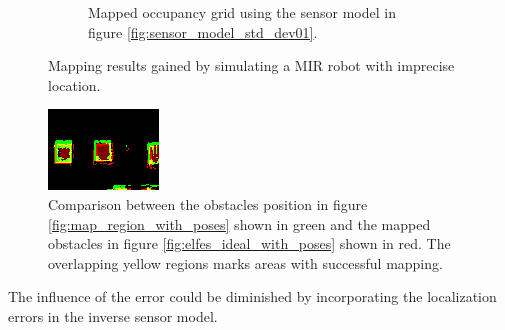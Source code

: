 \begin{figure}[htbp]
\begin{subfigure}[t]{0.45\textwidth}
		\caption{Mapped occupancy grid using the sensor model in figure \vref{fig:sensor_model_std_dev01}.}
		\label{fig:elfes_ideal_with_poses}
	\end{subfigure}
	\caption{Mapping results gained by simulating a MIR robot with imprecise location.}
	\label{fig:simulated_location_error}
\end{figure}

\begin{figure}[htbp]
	\centering
	\includegraphics[width=0.5\linewidth]{figures/static_mapping/elfes_ideal_no_decay}
	\caption{Comparison between the obstacles position in figure  \vref{fig:map_region_with_poses} shown in green and the mapped obstacles in figure \vref{fig:elfes_ideal_with_poses} shown in red. The overlapping yellow regions marks areas with successful mapping.}
	\label{fig:elfes_compare}
\end{figure}

The influence of the error could be diminished by incorporating the localization errors in the inverse sensor model.
